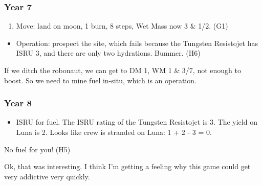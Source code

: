 \documentclass[]{article}
\providecommand{\tightlist}{%
  \setlength{\itemsep}{0pt}\setlength{\parskip}{0pt}}
\begin{document}
\subsubsection{Year 7}\label{year-7}

\begin{enumerate}
\def\labelenumi{\arabic{enumi}.}
\tightlist
\item
  Move: land on moon, 1 burn, 8 steps, Wet Mass now 3 \& 1/2. (G1)
\end{enumerate}

\begin{itemize}
\tightlist
\item
  Operation: prospect the site, which fails because the Tungsten
  Resistojet has ISRU 3, and there are only two hydrations. Bummer. (H6)
\end{itemize}

If we ditch the robonaut, we can get to DM 1, WM 1 \& 3/7, not enough to
boost. So we need to mine fuel in-situ, which is an operation.

\subsubsection{Year 8}\label{year-8}

\begin{itemize}
\tightlist
\item
  ISRU for fuel. The ISRU rating of the Tungsten Resistojet is 3. The
  yield on Luna is 2. Looks like crew is stranded on Luna: 1 + 2 - 3 =
  0.
\end{itemize}

No fuel for you! (H5)

Ok, that was interesting. I think I'm getting a feeling why this game
could get very addictive very quickly.
\end{document}

